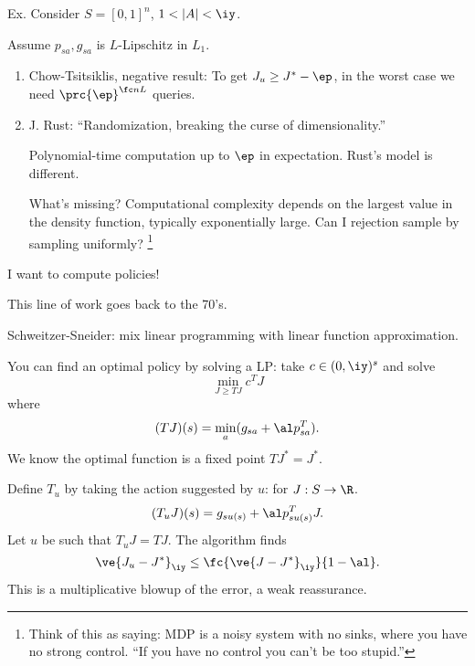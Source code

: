 Ex. Consider $S=[0,1]^n$, $1<|A|<\iy$.

Assume $p_{sa},g_{sa}$ is $L$-Lipschitz in $L_1$.
\begin{enumerate}
\item
Chow-Tsitsiklis, negative result: To get $J_u\ge J^* - \ep$, in the worst case we need $\prc{\ep}^{\fc nL}$ queries. 
\item
J. Rust: ``Randomization, breaking the curse of dimensionality.''

Polynomial-time computation up to $\ep$ in expectation. Rust's model is different.

What's missing? 
Computational complexity depends on the largest value in the density function, typically exponentially large.
Can I rejection sample by sampling uniformly? 
%
\footnote{Think of this as saying: MDP  is a noisy system with no sinks, where you have no strong control. 
``If you have no control you can't be too stupid.''}
\end{enumerate}
I want to compute policies!

This line of work goes back to the 70's. 

Schweitzer-Sneider: mix linear programming with linear function approximation.

You can find an optimal policy by solving a LP: take $c\in (0,\iy)^s$ and solve
$$
\min_{J\ge TJ} c^TJ
$$
where
$$
(TJ)(s) = \min_a (g_{sa} + \al p_{sa}^T).
$$
We know the optimal function is a fixed point $TJ^*=J^*$.

Define $T_u$ by taking the action suggested by $u$: for $J:S\to \R$.
$$
(T_uJ)(s) = g_{su(s)} + \al p_{su(s)}^TJ.
$$
Let $u$ be such that $T_uJ = TJ$. The algorithm finds
$$
\ve{J_u-J^*}_{\iy} \le \fc{\ve{J-J^*}_\iy}{1-\al}.
$$
This is a multiplicative blowup of the error, a weak reassurance.

